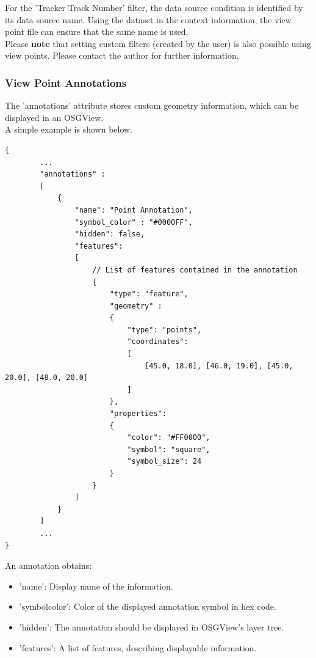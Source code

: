 For the 'Tracker Track Number' filter, the data source condition is identified by its data source name. Using the dataset in the context information, the view point file can ensure that the same name is used. \\

Please \textbf{note} that setting custom filters (created by the user) is also possible using view points. Please contact the author for further information.

\subsubsection{View Point Annotations}

The 'annotations' attribute stores custom geometry information, which can be displayed in an OSGView. \\

A simple example is shown below.

\begin{lstlisting}[basicstyle=\small\ttfamily]
{
        ...
        "annotations" :
        [
            {
                "name": "Point Annotation", 
                "symbol_color" : "#0000FF",
                "hidden": false,
                "features":
                [
                    // List of features contained in the annotation 
                    {
                        "type": "feature",
                        "geometry" :
                        {
                            "type": "points",
                            "coordinates": 
                            [
                                [45.0, 18.0], [46.0, 19.0], [45.0, 20.0], [48.0, 20.0]
                            ]
                        },
                        "properties":
                        {
                            "color": "#FF0000",
                            "symbol": "square",
                            "symbol_size": 24
                        }
                    }    
                ]
            }
        ]
        ...
}
\end{lstlisting}

An annotation obtains: \\

\begin{itemize}
    \item 'name': Display name of the information.
    \item 'symbol\textunderscore color': Color of the displayed annotation symbol in hex code.
    \item 'hidden': The annotation should be displayed in OSGView's layer tree.
    \item 'features': A list of features, describing displayable information. \\
\end{itemize}

